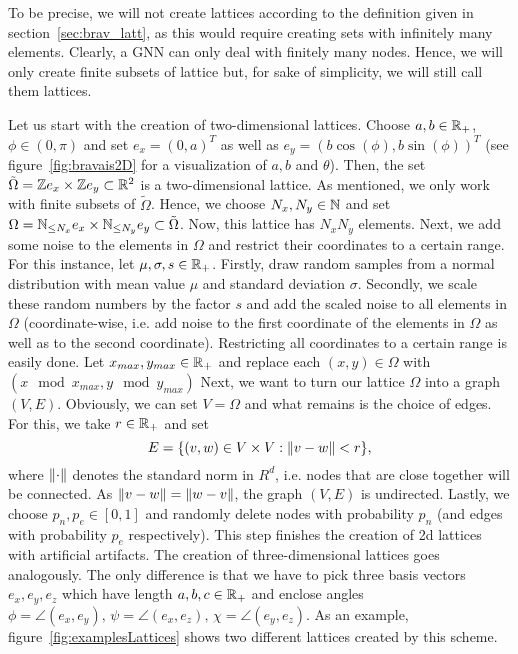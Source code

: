 \label{sec:creationLattice}

To be precise, we will not create lattices according to the definition given in section~\ref{sec:brav_latt}, 
as this would require creating sets with infinitely many elements. Clearly, a GNN can only deal with finitely many nodes.
Hence, we will only create finite subsets of lattice but, for sake of simplicity, we will still call them lattices.

Let us start with the creation of two-dimensional lattices.
Choose $a,b\in\mathbb{R}_+$, $\phi\in(0,\pi)$ and set
$e_x=(0,a)^T$ as well as $e_y=(b\cos(\phi), b\sin(\phi))^T$ (see figure~\ref{fig:bravais2D} for a visualization of $a,b$ and $\theta$). 
Then, the set $\tilde{\Omega}=\mathbb{Z} e_x\times\mathbb{Z} e_y\subset\mathbb{R}^2$ is a two-dimensional lattice.
As mentioned, we only work with finite subsets of $\tilde{\Omega}$. Hence, we choose $N_x,N_y\in\mathbb{N}$ and set $\Omega=\mathbb{N}_{\leq N_x}e_x\times\mathbb{N}_{\leq N_y}e_y\subset\tilde{\Omega}$.
Now, this lattice has $N_xN_y$ elements.
Next, we add some noise to the elements in $\Omega$ and restrict their coordinates to a certain range. For this instance, let $\mu,\sigma,s\in\mathbb{R}_+$. Firstly, draw random samples from
a normal distribution with mean value $\mu$ and standard deviation $\sigma$. Secondly, we scale these random numbers by the factor $s$ 
and add the scaled noise to all elements in $\Omega$ (coordinate-wise, i.e. add noise to the first coordinate of the elements in $\Omega$ as well as to the second coordinate).
Restricting all coordinates to a certain range is easily done. Let $x_{max}, y_{max}\in\mathbb{R}_+$ and replace each $(x,y)\in\Omega$ with $(x \mod x_{max}, y \mod y_{max})$ 
Next, we want to turn our lattice $\Omega$ into a graph $(V,E)$. Obviously, we can set $V=\Omega$ and what remains is the choice of edges. For this, we take $r\in\mathbb{R}_+$ and set
\begin{equation*}
    E=\{(v, w)\in V\times V: \lVert v-w\rVert<r\},
\end{equation*}
where $\lVert\cdot\rVert$ denotes the standard norm in $R^d$, i.e. nodes that are close together will be connected.
As $\lVert v-w\rVert=\lVert w-v\rVert$, the graph $(V,E)$ is undirected.
Lastly, we choose $p_n,p_e\in[0,1]$ and randomly delete nodes with probability $p_n$ (and edges with probability $p_e$ respectively).
This step finishes the creation of 2d lattices with artificial artifacts.
The creation of three-dimensional lattices goes analogously. The only difference is that we have to pick three basis vectors $e_x,e_y,e_z$ which have length $a,b,c\in\mathbb{R}_+$ and 
enclose angles $\phi=\angle(e_x, e_y),\,\psi=\angle(e_x,e_z),\,\chi=\angle(e_y,e_z)$. 
As an example, figure~\ref{fig:examplesLattices} shows two different lattices created by this scheme.

